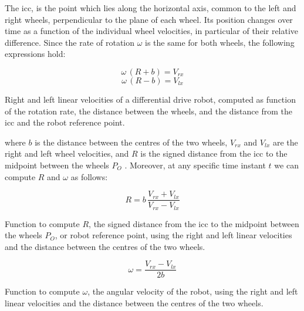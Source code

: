 The \gls{icc}, is the point which lies along the horizontal axis, common to the left 
and right wheels, perpendicular to the plane of each wheel. Its position changes 
over time as a function of the individual wheel velocities, in particular of their 
relative difference. Since the rate of rotation $\omega$ is the same for both 
wheels, the following expressions hold:
\begin{Equation}[!h]
	\centering
	\begin{equation}
	\omega \, (R + b) = V_{rx}
	\end{equation}
	\begin{equation}
	\omega \, (R - b) = V_{lx}
	\end{equation}
	\caption[Right and left linear velocities of a differential drive robot.]{Right and 
	left linear velocities of a differential drive robot, computed as function of the 
	rotation rate, the distance between the wheels, and the distance from the 
	\gls{icc} and the robot reference point.}
	\label{eq:velocities}
\end{Equation}

\noindent
where $b$ is the distance between the centres of the two wheels, $V_{rx}$ and 
$V_{lx}$ are the right and left wheel velocities, and $R$ is the signed distance 
from the \gls{icc} to the midpoint between the wheels $P_O$ 
\cite[][]{dudek2010computational}. 
Moreover, at any specific time instant $t$ we can compute $R$ and  $\omega$ as 
follows:
\begin{Equation}[!h]
	\centering
	\begin{equation}
	R = b \, \frac{V_{rx} + V_{lx}}{V_{rx} - V_{lx}}
	\end{equation}
	\caption[Function to compute the distance from the \gls{icc} and the robot 
	reference point.]{Function to compute $R$, the signed distance from the 
	\gls{icc} to the midpoint between the wheels $P_O$, or robot reference point, 
	using the right and left linear velocities and the distance between the centres of 
	the two wheels.}
	\label{eq:r}
\end{Equation}

\begin{Equation}[!h]
	\centering
	\begin{equation}
	\omega = \frac{V_{rx} - V_{lx}}{2b}
	\end{equation}
	\caption[Function to compute the angular velocity of the robot.]{Function to 
	compute $\omega$, the angular velocity of the robot, using the right and left 
	linear velocities and the distance between the centres of the two wheels.}
	\label{eq:omega}
\end{Equation}

